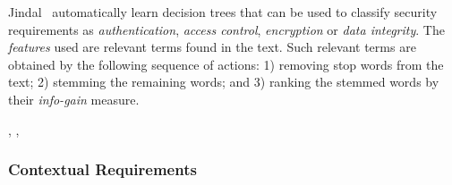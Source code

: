 Jindal\etal~\cite{Jildal:2016} automatically learn decision trees that can be
used to classify security requirements as \emph{authentication}, \emph{access
control}, \emph{encryption} or \emph{data integrity}. The \emph{features} used
are relevant terms found in the text. Such relevant terms are obtained by the
following sequence of actions: 1) removing stop words from the text; 2) stemming
the remaining words; and 3) ranking the stemmed words by their \emph{info-gain}
measure.

\cite{Jildal:2016}, \cite{Riaz:2014}, \cite{Knauss:2011} 

\subsubsection{Contextual Requirements} 

